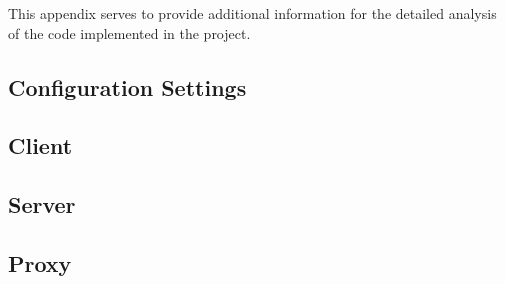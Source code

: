 \documentclass[10pt,twocolumn]{witseiepaper}
\begin{document}
	This appendix serves to provide additional information for the detailed analysis of the code implemented in the project.
	
	\subsection{Configuration Settings}
	\label{app:config}
		
		
		
		
		
	\subsection{Client}
	\label{app:client}
	
		
		
		
		
		
		
	\subsection{Server}
	\label{app:server}
	
		

		
		
	\subsection{Proxy}
	\label{app:proxy}
	
\end{document}
